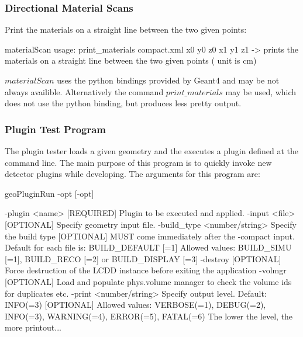 \documentclass[10pt,a4paper]{article}
\begin{document}
\subsubsection{Directional Material Scans}
\label{sec:dd4hep-manual-directional-material-scans}
\noindent
Print the materials on a straight line between the two given points:
\begin{code}
materialScan
 usage: print_materials compact.xml x0 y0 z0 x1 y1 z1 
        -> prints the materials on a straight line between the two given points ( unit is cm) 
\end{code}
$materialScan$ uses the python bindings provided by Geant4 and may be not 
always availible. Alternatively the command $print\_materials$ may be used, 
which does not use the python binding, but produces less pretty output.

\subsubsection{Plugin Test Program}
\label{sec:dd4hep-manual-plugin-test}
\noindent
The plugin tester loads a given geometry and the executes a plugin
defined at the command line. The main purpose of this program is to quickly 
invoke new detector plugins while developing. The arguments for this 
program are:
\begin{code}
    geoPluginRun -opt [-opt]                                                
    
        -plugin <name>  [REQUIRED]  Plugin to be executed and applied.        
        -input  <file>  [OPTIONAL]  Specify geometry input file.              
        -build_type <number/string> Specify the build type                         
                     [OPTIONAL]     MUST come immediately after the -compact input.
                                    Default for each file is: BUILD_DEFAULT [=1]   
                                    Allowed values: BUILD_SIMU [=1], BUILD_RECO [=2] or BUILD_DISPLAY [=3]
        -destroy     [OPTIONAL]     Force destruction of the LCDD instance         
                                    before exiting the application                 
        -volmgr      [OPTIONAL]     Load and populate phys.volume manager to       
                                    check the volume ids for duplicates etc.       
        -print      <number/string> Specify output level. Default: INFO(=3)        
                     [OPTIONAL]     Allowed values: VERBOSE(=1), DEBUG(=2),        
                                    INFO(=3), WARNING(=4), ERROR(=5), FATAL(=6)    
                                    The lower the level, the more printout...      


\end{code}
\end{document}
